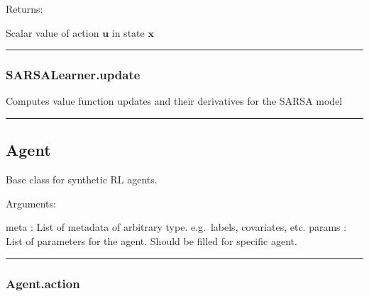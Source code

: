 Returns:

Scalar value of action \(\mathbf u\) in state \(\mathbf x\)

\begin{center}\rule{0.5\linewidth}{\linethickness}\end{center}

\subsubsection{SARSALearner.update}\label{sarsalearner.update}

\begin{Shaded}
\begin{Highlighting}[]
\end{Highlighting}
\end{Shaded}

Computes value function updates and their derivatives for the SARSA
model

\begin{center}\rule{0.5\linewidth}{\linethickness}\end{center}

\subsection{Agent}\label{agent}

\begin{Shaded}
\begin{Highlighting}[]
\end{Highlighting}
\end{Shaded}

Base class for synthetic RL agents.

Arguments:

meta : List of metadata of arbitrary type. e.g.~labels, covariates, etc.
params : List of parameters for the agent. Should be filled for specific
agent.

\begin{center}\rule{0.5\linewidth}{\linethickness}\end{center}

\subsubsection{Agent.action}\label{agent.action}

\begin{Shaded}
\begin{Highlighting}[]
\end{Highlighting}
\end{Shaded}


